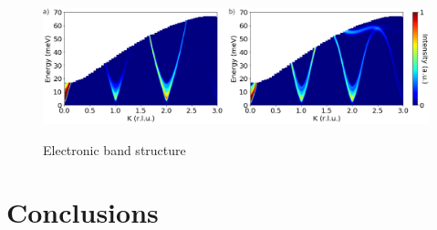 \documentclass[11pt,edeposit,draftthesis]{uiucthesis2020}
\begin{document}
\begin{mainmatter}
\begin{figure}
\centering\includegraphics[width=\columnwidth]{figures/ch8/suppl_simulated_magnon_spectra_3J.png} \\
\caption{\label{fig:3J_fits}
Electronic band structure
}
\end{figure}

\Blindtext[6]

\chapter{Conclusions}

\Blindtext[6]

\end{mainmatter}



\begin{backmatter}




\end{backmatter}



\end{document}
